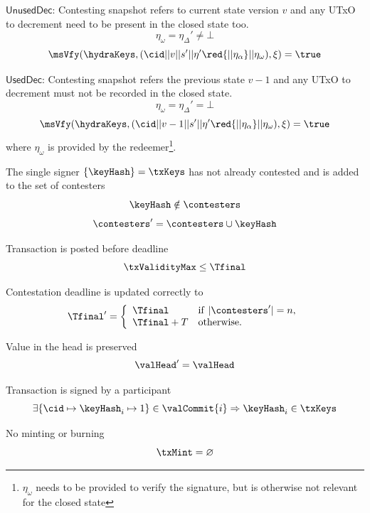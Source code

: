 \begin{menumerate}
\begin{menumerate}
		\item $\mathsf{UnusedDec}$: Contesting snapshot refers to current state version $v$ and any UTxO to decrement need to be present in the closed state too.
		\[
			\eta_\omega = \eta_\Delta' \neq \bot
		\]
    \red{
		  \[
		  	\eta_\alpha = \bot
		  \]
    }
		\[
      \msVfy(\hydraKeys,(\cid || v || s' || \eta' \red{|| \eta_\alpha} || \eta_\omega),\xi) = \true
		\]

		\item $\mathsf{UsedDec}$: Contesting snapshot refers the previous state $v - 1$ and any UTxO to decrement must not be recorded in the closed state.
		\[
	 		\eta_\omega = \eta_\Delta' = \bot
		\]
    \red{
		  \[
		  	\eta_\alpha = \bot
		  \]
    }
		\[
      \msVfy(\hydraKeys,(\cid || v - 1 || s' || \eta' \red{|| \eta_\alpha} || \eta_\omega),\xi) = \true
		\]
		where $\eta_\omega$ is provided by the redeemer\footnote{$\eta_\omega$ needs to be provided to verify the signature, but is otherwise not relevant for the closed state}.
	\end{menumerate}

	\item The single signer $\{\keyHash\} = \txKeys$ has not already contested and is added to the set of contesters
	\[
		\keyHash \notin \contesters
	\]
	\[
		\contesters' = \contesters \cup \keyHash
	\]
	\item Transaction is posted before deadline
	\[
		\txValidityMax \leq \Tfinal
	\]
	\item Contestation deadline is updated correctly to
	\[
		\Tfinal' = \left\{\begin{array}{ll}
			\Tfinal     & \mathrm{if} ~ |\contesters'| = n, \\
			\Tfinal + T & \mathrm{otherwise.}
		\end{array}\right.
	\]
	\item Value in the head is preserved
	\[
		\valHead' = \valHead
	\]
	\item Transaction is signed by a participant
	\[
		\exists \{\cid \mapsto \keyHash_{i} \mapsto 1\} \in \valCommit{i} \Rightarrow \keyHash_{i} \in \txKeys
	\]
	\item No minting or burning
	\[
		\txMint = \varnothing
	\]
\end{menumerate}

